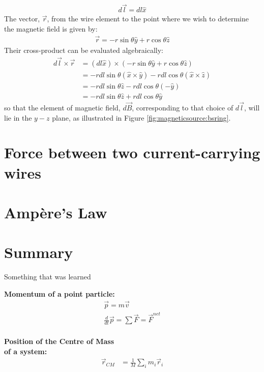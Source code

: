 \begin{align*}
d\vec l = dl \hat x
\end{align*}
The vector, $\vec r$, from the wire element to the point where we wish to determine the magnetic field is given by:
\begin{align*}
\vec r =  - r\sin\theta \hat y+r\cos\theta \hat z
\end{align*}
Their cross-product can be evaluated algebraically:
\begin{align*}
d\vec l \times \vec r &= (dl \hat x) \times ( - r\sin\theta \hat y+r\cos\theta \hat z)\\
&=-rdl\sin\theta (\hat x \times \hat y) - rdl\cos\theta (\hat x \times \hat z)\\
&=-rdl\sin\theta\hat z - rdl\cos\theta (-\hat y)\\
&=-rdl\sin\theta\hat z + rdl\cos\theta \hat y
\end{align*}
so that the element of magnetic field, $d\vec B$, corresponding to that choice of $d\vec l$, will lie in the $y-z$ plane, as illustrated in Figure \ref{fig:magneticsource:bsring}.
\section{Force between two current-carrying wires}

\section{Ampère's Law}

\newpage
\section{Summary}

\begin{chapterSummary}
 Something that was learned
\end{chapterSummary}

\newpage
\begin{importantEquations}
\medskip
\begin{multicols}{2}
\textbf{Momentum of a point particle:}
\begin{align*}
\vec p = m\vec v \\
\frac{d}{dt}\vec p = \sum \vec F = \vec F^{net}
\end{align*}
\columnbreak
\\
\textbf{Position of the Centre of Mass \\ of a system:}
\begin{align*}
\vec r_{CM} &=\frac{1}{M}\sum_i m_i\vec r_i 
\end{align*}
\medskip
\end{multicols}
\end{importantEquations}


